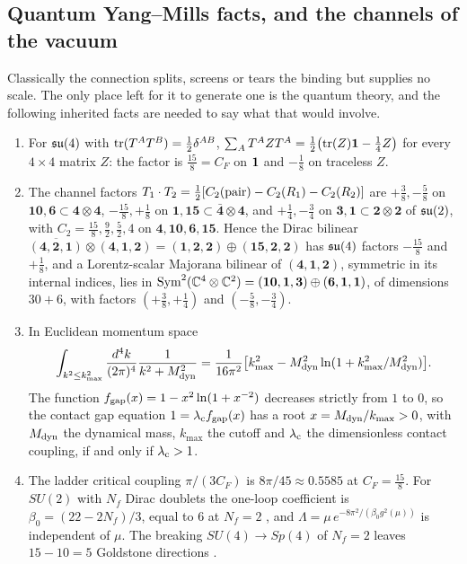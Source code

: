 \subsection{Quantum Yang--Mills facts, and the channels of the vacuum}
\label{sec:bf-quantum}

Classically the connection splits, screens or tears the binding but supplies no scale. The only place left for it to generate one is the
quantum theory, and the following inherited facts are needed to say what that would involve.

\begin{proposition}
\label{bf:qym}
\begin{enumerate}[label=(\roman*),leftmargin=2.2em]
\item For $\mathfrak{su}(4)$ with $\operatorname{tr}(T^AT^B)=\tfrac12\delta^{AB}$, $\sum_AT^AZT^A=\tfrac12\bigl(\operatorname{tr}(Z)\mathbf 1-\tfrac14Z\bigr)$ for every $4\times4$ matrix $Z$: the factor is
$\tfrac{15}8=C_F$ on $\mathbf 1$ and $-\tfrac18$ on traceless $Z$.
\item The channel factors $T_1\cdot T_2=\tfrac12[C_2(\text{pair})-C_2(R_1)-C_2(R_2)]$ are $+\tfrac38,-\tfrac58$ on $\mathbf{10},\mathbf6\subset\mathbf4\otimes\mathbf4$,
$-\tfrac{15}8,+\tfrac18$ on $\mathbf1,\mathbf{15}\subset\bar{\mathbf4}\otimes\mathbf4$, and $+\tfrac14,-\tfrac34$ on $\mathbf3,\mathbf1\subset\mathbf2\otimes\mathbf2$ of
$\mathfrak{su}(2)$, with $C_2=\tfrac{15}8,\tfrac92,\tfrac52,4$ on $\mathbf4,\mathbf{10},\mathbf6,\mathbf{15}$. Hence the Dirac bilinear
$\overline{(\mathbf4,\mathbf2,\mathbf1)}\otimes(\mathbf4,\mathbf1,\mathbf2)=(\mathbf1,\mathbf2,\mathbf2)\oplus(\mathbf{15},\mathbf2,\mathbf2)$ has $\mathfrak{su}(4)$ factors
$-\tfrac{15}8$ and $+\tfrac18$, and a Lorentz-scalar Majorana bilinear of $(\mathbf4,\mathbf1,\mathbf2)$, symmetric in its internal indices, lies in
$\mathrm{Sym}^2(\mathbb{C}^4\otimes\mathbb{C}^2)=(\mathbf{10},\mathbf1,\mathbf3)\oplus(\mathbf6,\mathbf1,\mathbf1)$, of dimensions $30+6$, with factors
$(+\tfrac38,+\tfrac14)$ and $(-\tfrac58,-\tfrac34)$.
\item In Euclidean momentum space
\[
\int_{k^2\le k_{\max}^2}\frac{d^4k}{(2\pi)^4}\frac1{k^2+M_{\rm dyn}^2}=\frac1{16\pi^2}\bigl[k_{\max}^2-M_{\rm dyn}^2\ln(1+k_{\max}^2/M_{\rm dyn}^2)\bigr].
\]
The function
$f_{\rm gap}(x)=1-x^2\ln(1+x^{-2})$ decreases strictly from $1$ to $0$, so the contact gap equation $1=\lambda_{\rm c}f_{\rm gap}(x)$ has a root
$x=M_{\rm dyn}/k_{\max}>0$, with $M_{\rm dyn}$ the dynamical mass, $k_{\max}$ the cutoff and $\lambda_{\rm c}$ the dimensionless contact coupling, if and only if $\lambda_{\rm c}>1$.
\item The ladder critical coupling $\pi/(3C_F)$ \cite{FukudaKugo76,Miransky93} is $8\pi/45\approx0.5585$ at $C_F=\tfrac{15}8$. For $SU(2)$ with $N_f$
Dirac doublets the one-loop coefficient is $\beta_0=(22-2N_f)/3$, equal to $6$ at $N_f=2$ \cite{GrossWilczek73,Politzer73}, and
$\Lambda=\mu\,e^{-8\pi^2/(\beta_0g^2(\mu))}$ is independent of $\mu$. The breaking $SU(4)\to Sp(4)$ of $N_f=2$ leaves $15-10=5$ Goldstone
directions \cite{Peskin80}.
\end{enumerate}
\end{proposition}

